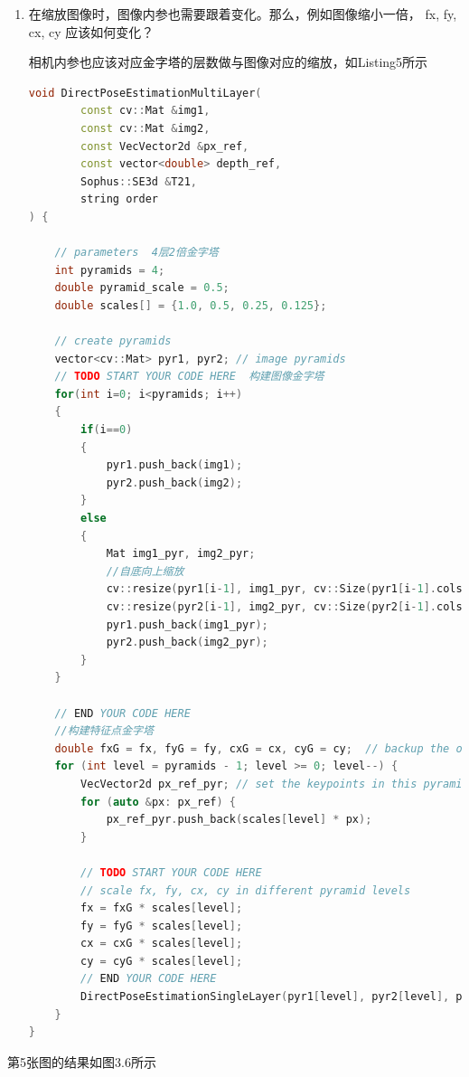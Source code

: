 \documentclass[40pt,a4paper，UTF8]{ctexart}
\numberwithin{equation}{section}
\begin{document}
\begin{enumerate}
\item 在缩放图像时，图像内参也需要跟着变化。那么，例如图像缩小一倍， fx, fy, cx, cy 应该如何变化？

相机内参也应该对应金字塔的层数做与图像对应的缩放，如Listing5所示

\begin{lstlisting}[language=C++, caption=DirectPoseEstimationMultiLayer函数]
void DirectPoseEstimationMultiLayer(
        const cv::Mat &img1,
        const cv::Mat &img2,
        const VecVector2d &px_ref,
        const vector<double> depth_ref,
        Sophus::SE3d &T21,
        string order
) {

    // parameters  4层2倍金字塔
    int pyramids = 4;
    double pyramid_scale = 0.5;
    double scales[] = {1.0, 0.5, 0.25, 0.125};

    // create pyramids
    vector<cv::Mat> pyr1, pyr2; // image pyramids
    // TODO START YOUR CODE HERE  构建图像金字塔
    for(int i=0; i<pyramids; i++)
    {
        if(i==0)
        {
            pyr1.push_back(img1);
            pyr2.push_back(img2);
        }
        else
        {
            Mat img1_pyr, img2_pyr;
            //自底向上缩放
            cv::resize(pyr1[i-1], img1_pyr, cv::Size(pyr1[i-1].cols * pyramid_scale, pyr1[i-1].rows * pyramid_scale));   //Size(width, height)
            cv::resize(pyr2[i-1], img2_pyr, cv::Size(pyr2[i-1].cols * pyramid_scale, pyr2[i-1].rows * pyramid_scale));
            pyr1.push_back(img1_pyr);
            pyr2.push_back(img2_pyr);
        }
    }

    // END YOUR CODE HERE
    //构建特征点金字塔
    double fxG = fx, fyG = fy, cxG = cx, cyG = cy;  // backup the old values
    for (int level = pyramids - 1; level >= 0; level--) {
        VecVector2d px_ref_pyr; // set the keypoints in this pyramid level
        for (auto &px: px_ref) {
            px_ref_pyr.push_back(scales[level] * px);
        }

        // TODO START YOUR CODE HERE
        // scale fx, fy, cx, cy in different pyramid levels
        fx = fxG * scales[level];
        fy = fyG * scales[level];
        cx = cxG * scales[level];
        cy = cyG * scales[level];
        // END YOUR CODE HERE
        DirectPoseEstimationSingleLayer(pyr1[level], pyr2[level], px_ref_pyr, depth_ref, T21, order);
    }
}
\end{lstlisting}
\end{enumerate}

第5张图的结果如图3.6所示
\end{document}
